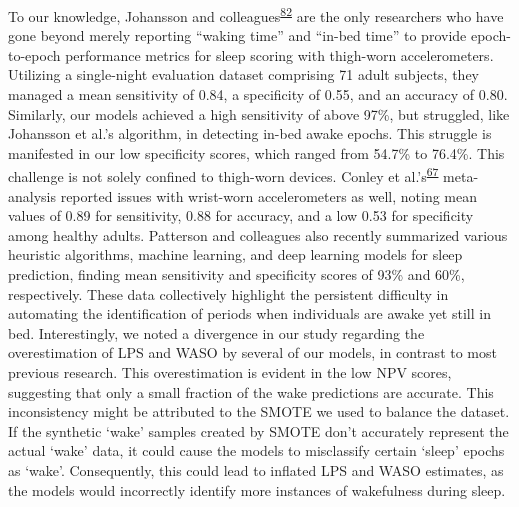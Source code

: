 \documentclass[
  10pt,
]{scrbook}
\begin{document}
To our knowledge, Johansson and
colleagues\textsuperscript{\protect\hyperlink{ref-johansson_development_2023}{82}}
are the only researchers who have gone beyond merely reporting ``waking
time'' and ``in-bed time'' to provide epoch-to-epoch performance metrics
for sleep scoring with thigh-worn accelerometers. Utilizing a
single-night evaluation dataset comprising 71 adult subjects, they
managed a mean sensitivity of 0.84, a specificity of 0.55, and an
accuracy of 0.80. Similarly, our models achieved a high sensitivity of
above 97\%, but struggled, like Johansson et al.'s algorithm, in
detecting in-bed awake epochs. This struggle is manifested in our low
specificity scores, which ranged from 54.7\% to 76.4\%. This challenge
is not solely confined to thigh-worn devices. Conley et
al.'s\textsuperscript{\protect\hyperlink{ref-conley_agreement_2019}{67}}
meta-analysis reported issues with wrist-worn accelerometers as well,
noting mean values of 0.89 for sensitivity, 0.88 for accuracy, and a low
0.53 for specificity among healthy adults. Patterson and colleagues also
recently summarized various heuristic algorithms, machine learning, and
deep learning models for sleep prediction, finding mean sensitivity and
specificity scores of 93\% and 60\%, respectively. These data
collectively highlight the persistent difficulty in automating the
identification of periods when individuals are awake yet still in bed.
Interestingly, we noted a divergence in our study regarding the
overestimation of LPS and WASO by several of our models, in contrast to
most previous research. This overestimation is evident in the low NPV
scores, suggesting that only a small fraction of the wake predictions
are accurate. This inconsistency might be attributed to the SMOTE we
used to balance the dataset. If the synthetic `wake' samples created by
SMOTE don't accurately represent the actual `wake' data, it could cause
the models to misclassify certain `sleep' epochs as `wake'.
Consequently, this could lead to inflated LPS and WASO estimates, as the
models would incorrectly identify more instances of wakefulness during
sleep.
\end{document}
